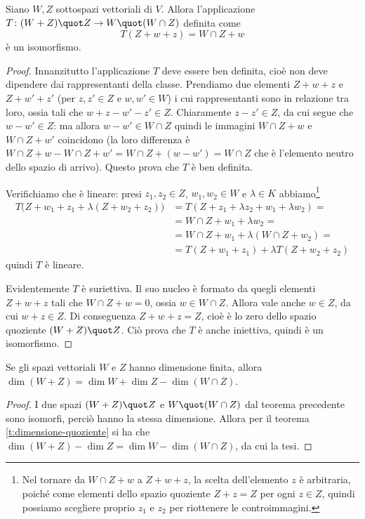 \begin{teorema}
	Siano $W,Z$ sottospazi vettoriali di $V$.
	Allora l'applicazione $T\colon (W+Z)\quot Z\to W\quot(W\cap Z)$ definita come
	\begin{equation}
		T(Z+w+z)=W\cap Z+w
	\end{equation}
	è un isomorfismo.
\end{teorema}
\begin{proof}
	Innanzitutto l'applicazione $T$ deve essere ben definita, cioè non deve dipendere dai rappresentanti della classe.
	Prendiamo due elementi $Z+w+z$ e $Z+w'+z'$ (per $z,z'\in Z$ e $w,w'\in W$) i cui rappresentanti sono in relazione tra loro, ossia tali che $w+z-w'-z'\in Z$.
	Chiaramente $z-z'\in Z$, da cui segue che $w-w'\in Z$: ma allora $w-w'\in W\cap Z$ quindi le immagini $W\cap Z+w$ e $W\cap Z+w'$ coincidono (la loro differenza è $W\cap Z+w-W\cap Z+w'=W\cap Z+(w-w')=W\cap Z$ che è l'elemento neutro dello spazio di arrivo).
	Questo prova che $T$ è ben definita.
	
	Verifichiamo che è lineare: presi $z_1,z_2\in Z$, $w_1,w_2\in W$ e $\lambda\in K$ abbiamo\footnote{Nel tornare da $W\cap Z+w$ a $Z+w+z$, la scelta dell'elemento $z$ è arbitraria, poich\'e come elementi dello spazio quoziente $Z+z=Z$ per ogni $z\in Z$, quindi possiamo scegliere proprio $z_1$ e $z_2$ per riottenere le controimmagini.}
	\begin{equation}
		\begin{split}
			T\big(Z+w_1+z_1+\lambda(Z+w_2+z_2)\big)&=T(Z+z_1+\lambda z_2+w_1+\lambda w_2)=\\
			&=W\cap Z+w_1+\lambda w_2=\\
			&=W\cap Z+w_1+\lambda(W\cap Z+w_2)=\\
			&=T(Z+w_1+z_1)+\lambda T(Z+w_2+z_2)
		\end{split}
	\end{equation}
	quindi $T$ è lineare.

	Evidentemente $T$ è suriettiva.
	Il suo nucleo è formato da quegli elementi $Z+w+z$ tali che $W\cap Z+w=0$, ossia $w\in W\cap Z$.
	Allora vale anche $w\in Z$, da cui $w+z\in Z$.
	Di conseguenza $Z+w+z=Z$, cioè è lo zero dello spazio quoziente $(W+Z)\quot Z$.
	Ciò prova che $T$ è anche iniettiva, quindi è un isomorfismo.
\end{proof}
\begin{corollario}
	Se gli spazi vettoriali $W$ e $Z$ hanno dimensione finita, allora $\dim(W+Z)=\dim W+\dim Z-\dim(W\cap Z)$.
\end{corollario}
\begin{proof}
	I due spazi $(W+Z)\quot Z$ e $W\quot(W\cap Z)$ dal teorema precedente sono isomorfi, perciò hanno la stessa dimensione.
	Allora per il teorema \ref{t:dimensione-quoziente} si ha che $\dim(W+Z)-\dim Z=\dim W-\dim(W\cap Z)$, da cui la tesi.
\end{proof}

